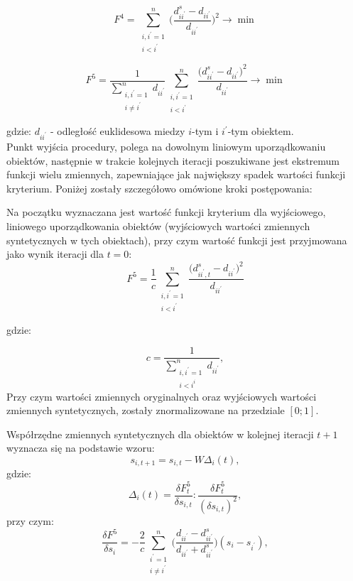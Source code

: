 \documentclass[12pt,a4paper]{report}
\begin{document}
\begin{equation}
F^{4}=\sum_{\substack{i,i^{'}=1 \\ i<i^{'}}}^{n} \bigg( \frac{d_{ii^{'}}^{s} - d_{ii^{'}}}{d_{ii^{'}}} \bigg) ^2  \rightarrow     \min  
\end{equation}

\begin{equation}
F^{5}=\frac{1}{\sum_ {\substack{i,i^{'}=1 \\ i\neq i^{'}}}^{n} d_{ii^{'}}} \sum_{\substack{i,i^{'}=1 \\ i<i^{'}}}^{n} \frac{\bigg(d_{ii^{'}}^{s} - d_{ii^{'}}\bigg)^2}{d_{ii^{'}}}\rightarrow     \min  
\end{equation}

gdzie:
\newline
$d_{ii^{'}}$ - odległość euklidesowa miedzy $i$-tym i $i^{'}$-tym obiektem.\\
\newline
Punkt wyjścia procedury, polega na dowolnym liniowym uporządkowaniu obiektów, następnie w trakcie kolejnych iteracji poszukiwane jest ekstremum funkcji wielu zmiennych, zapewniające jak największy spadek wartości funkcji kryterium. Poniżej zostały szczegółowo omówione kroki postępowania:

Na początku wyznaczana jest wartość funkcji kryterium dla wyjściowego, liniowego uporządkowania obiektów (wyjściowych wartości zmiennych syntetycznych w tych obiektach), przy czym wartość funkcji jest przyjmowana jako wynik iteracji dla $t = 0$:
\begin{equation}
F^{5}=\frac{1}{c} \sum_{\substack{i,i^{'}=1 \\ i<i^{'}}}^{n} \frac{\bigg(d_{ii^{'},t}^{s} - d_{ii^{'}}\bigg)^2}{d_{ii^{'}}}
\end{equation}

gdzie:

\begin{equation}
c=\frac{1}{\sum_{\substack{i,i^{'}=1 \\ i<i^{i}}}^n d_{ii^{'}}},
\end{equation}
Przy czym wartości zmiennych oryginalnych oraz wyjściowych wartości zmiennych syntetycznych, zostały znormalizowane na przedziale $[0;1]$.

Współrzędne zmiennych syntetycznych dla obiektów w kolejnej iteracji $t+1$ wyznacza się na podstawie wzoru:
\begin{equation}
s_{i,t+1}=s_{i,t} - W\Delta_{i}(t),
\end{equation}
gdzie:
\begin{equation}
\Delta_{i}(t)=\frac{\delta F_{t}^{5}}{\delta s_{i,t}} : \frac{\delta F_{t}^{5}}{(\delta s_{i,t})^{2}},
\end{equation}
przy czym:
\begin{equation}
\frac{\delta F^{5}}{\delta s_{i}}=-\frac{2}{c}\sum_{\substack{i^{'}=1 \\ i \neq i^{'}}}^n \bigg( \frac{d_{ii^{'}} - d_{ii^{'}}^s}{d_{ii^{'}}+d_{ii^{'}}^{s}} \bigg)(s_{i} - s_{i^{'}}),
\end{equation}
\end{document}
